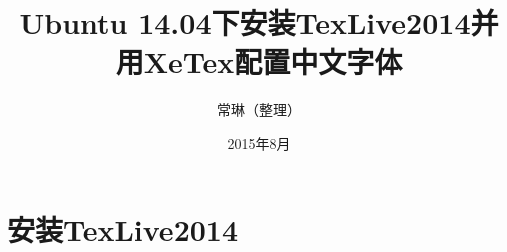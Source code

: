\documentclass[12pt]{article}
\begin{document}
\title{\vspace{-2em}Ubuntu 14.04下安装TexLive2014并用XeTex配置中文字体\vspace{-0.7em}}
\author{常琳（整理）}
\date{\vspace{-0.7em}2015年8月\vspace{-0.7em}}
\maketitle\thispagestyle{fancy}
\maketitle
\tableofcontents 

\section{安装TexLive2014}
\end{document}
